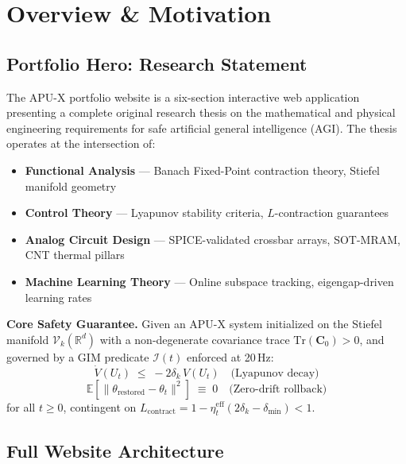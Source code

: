 \documentclass[12pt, a4paper]{article}
\begin{document}
\newpage
\tableofcontents
\newpage

\section{Overview \& Motivation}
\label{sec:hero}

\subsection{Portfolio Hero: Research Statement}

The APU-X portfolio website is a six-section interactive web application presenting
a complete original research thesis on the mathematical and physical engineering
requirements for safe artificial general intelligence (AGI). The thesis operates
at the intersection of:

\begin{itemize}[noitemsep]
  \item \textbf{Functional Analysis} — Banach Fixed-Point contraction theory, Stiefel manifold geometry
  \item \textbf{Control Theory} — Lyapunov stability criteria, $L$-contraction guarantees
  \item \textbf{Analog Circuit Design} — SPICE-validated crossbar arrays, SOT-MRAM, CNT thermal pillars
  \item \textbf{Machine Learning Theory} — Online subspace tracking, eigengap-driven learning rates
\end{itemize}

\begin{cyanbox}
\textbf{Core Safety Guarantee.} Given an APU-X system initialized on the Stiefel
manifold $\mathcal{V}_k(\mathbb{R}^d)$ with a non-degenerate covariance trace
$\mathrm{Tr}(\mathbf{C}_0) > 0$, and governed by a GIM predicate
$\mathcal{I}(t)$ enforced at 20\,Hz:
$$
\dot{V}(U_t) \;\leq\; -2\delta_k\,V(U_t) \quad \text{(Lyapunov decay)}
$$
$$
\mathbb{E}\!\left[\|\theta_{\text{restored}} - \theta_t\|^2\right] \;\equiv\; 0 \quad \text{(Zero-drift rollback)}
$$
for all $t \geq 0$, contingent on $L_{\text{contract}} = 1 - \eta_t^{\text{eff}}(2\delta_k - \delta_{\min}) < 1$.
\end{cyanbox}

\subsection{Full Website Architecture}
\end{document}
